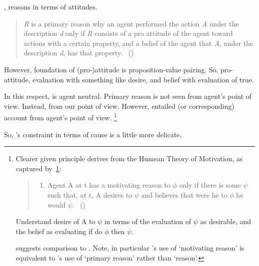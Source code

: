 \begin{note}
  \citeauthor{Davidson:1963aa}, reasons in terms of attitudes.

  \begin{quote}
    \emph{R} is a primary reason why an agent performed the action \emph{A} under the description \emph{d} only if \emph{R} consists of a pro attitude of the agent toward actions with a certain property, and a belief of the agent that \emph{A}, under the description \emph{d}, has that property.%
    \mbox{ }\hfill\mbox{(\citeyear[687]{Davidson:1963aa})}
  \end{quote}

  However, foundation of (pro-)attitude is proposition-value pairing.
  So, pro-attitude, evaluation with something like desire, and belief with evaluation of true.

  In this respect, \citeauthor{Davidson:1963aa} is agent neutral.
  Primary reason is not seen from agent's point of view.
  Instead, from our point of view.
  However, entailed (or corresponding) account from agent's point of view.%
  \footnote{
    Clearer given principle \citeauthor{Smith:1987vk} derives from the Humean Theory of Motivation, as captured by~\ref{Smithh:HtM:2}:
    \begin{quote}
      \begin{enumerate}[label=\textsc{P1}., ref=(\textsc{P1})]
      \item
        \label{Smithh:HtM:2}
        Agent A at t has a motivating reason to \(\phi\) only if there is some \(\psi\) such that, at t, A desires to \(\psi\) and believes that were he to \(\phi\) he would \(\psi\).%
        \mbox{ }\hfill\mbox{(\citeyear[36]{Smith:1987vk})}
      \end{enumerate}
    \end{quote}

    Understand desire of A to \(\psi\) in terms of the evaluation of \(\psi\) as desirable, and the belief as evaluating if do \(\phi\) then \(\psi\).

    \citeauthor{Smith:1987vk} suggests comparison to \textcite{Davidson:1963aa}.
    Note, in particular \citeauthor{Smith:1987vk}'s use of `motivating reason' is equivalent to \citeauthor{Davidson:1963aa}'s use of `primary reason' rather than `reason'.
  }

  So, \citeauthor{Davidson:1963aa}'s constraint in terms of cause is a little more delicate.
\end{note}

